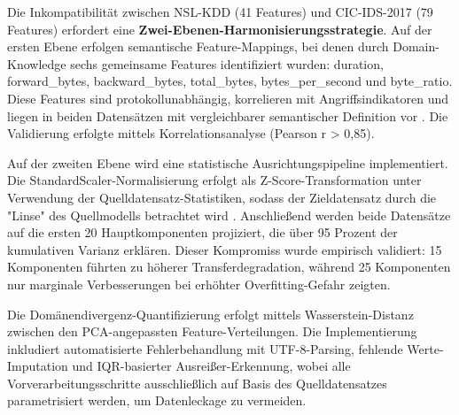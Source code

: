 \documentclass[11pt,a4paper]{article}
\begin{document}
    Die Inkompatibilität zwischen NSL-KDD (41 Features) und CIC-IDS-2017 (79 Features) erfordert eine \textbf{Zwei-Ebenen-Harmonisierungsstrategie}. Auf der ersten Ebene erfolgen semantische Feature-Mappings, bei denen durch Domain-Knowledge sechs gemeinsame Features identifiziert wurden: duration, forward\_bytes, backward\_bytes, total\_bytes, bytes\_per\_second und byte\_ratio. Diese Features sind protokollunabhängig, korrelieren mit Angriffsindikatoren und liegen in beiden Datensätzen mit vergleichbarer semantischer Definition vor \parencite{Gharib2016}. Die Validierung erfolgte mittels Korrelationsanalyse (Pearson r > 0,85).

    Auf der zweiten Ebene wird eine statistische Ausrichtungspipeline implementiert. Die StandardScaler-Normalisierung erfolgt als Z-Score-Transformation unter Verwendung der Quelldatensatz-Statistiken, sodass der Zieldatensatz durch die "Linse" des Quellmodells betrachtet wird \parencite{Goodfellow2016}. Anschließend werden beide Datensätze auf die ersten 20 Hauptkomponenten projiziert, die über 95 Prozent der kumulativen Varianz erklären. Dieser Kompromiss wurde empirisch validiert: 15 Komponenten führten zu höherer Transferdegradation, während 25 Komponenten nur marginale Verbesserungen bei erhöhter Overfitting-Gefahr zeigten.

    Die Domänendivergenz-Quantifizierung erfolgt mittels Wasserstein-Distanz zwischen den PCA-angepassten Feature-Verteilungen. Die Implementierung inkludiert automatisierte Fehlerbehandlung mit UTF-8-Parsing, fehlende Werte-Imputation und IQR-basierter Ausreißer-Erkennung, wobei alle Vorverarbeitungsschritte ausschließlich auf Basis des Quelldatensatzes parametrisiert werden, um Datenleckage zu vermeiden.
\end{document}
